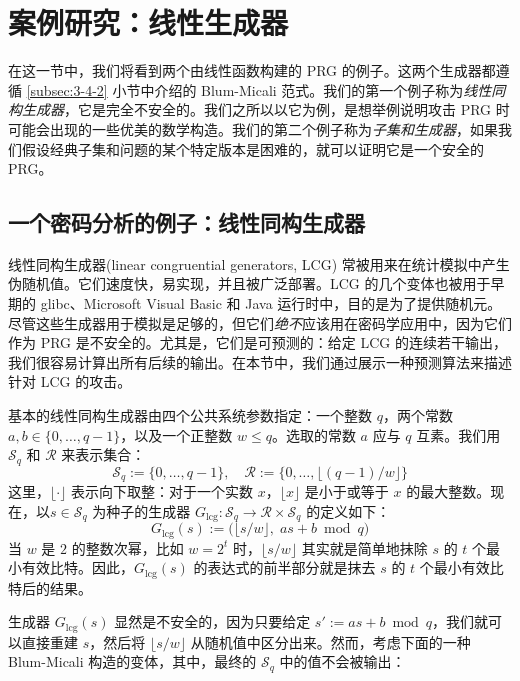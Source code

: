 \section{案例研究：线性生成器}

在这一节中，我们将看到两个由线性函数构建的 PRG 的例子。这两个生成器都遵循 \ref{subsec:3-4-2} 小节中介绍的 Blum-Micali 范式。我们的第一个例子称为\emph{线性同构生成器}，它是完全不安全的。我们之所以以它为例，是想举例说明攻击 PRG 时可能会出现的一些优美的数学构造。我们的第二个例子称为\emph{子集和生成器}，如果我们假设经典子集和问题的某个特定版本是困难的，就可以证明它是一个安全的 PRG。

\subsection{一个密码分析的例子：线性同构生成器}

线性同构生成器(linear congruential generators, LCG) 常被用来在统计模拟中产生伪随机值。它们速度快，易实现，并且被广泛部署。LCG 的几个变体也被用于早期的 glibc、Microsoft Visual Basic 和 Java 运行时中，目的是为了提供随机元。尽管这些生成器用于模拟是足够的，但它们\emph{绝不}应该用在密码学应用中，因为它们作为 PRG 是不安全的。尤其是，它们是可预测的：给定 LCG 的连续若干输出，我们很容易计算出所有后续的输出。在本节中，我们通过展示一种预测算法来描述针对 LCG 的攻击。

基本的线性同构生成器由四个公共系统参数指定：一个整数 $q$，两个常数 $a,b\in\{0,\dots,q-1\}$，以及一个正整数 $w\leq q$。选取的常数 $a$ 应与 $q$ 互素。我们用 $\mathcal{S}_q$ 和 $\mathcal{R}$ 来表示集合：
\[
\mathcal{S}_q:=\{0,\dots,q-1\},
\quad
\mathcal{R}:=\{0,\dots,\lfloor(q-1)/w\rfloor\}
\]
这里，$\lfloor\cdot\rfloor$ 表示向下取整：对于一个实数 $x$，$\lfloor x\rfloor$ 是小于或等于 $x$ 的最大整数。现在，以$s\in\mathcal{S}_q$ 为种子的生成器 $G_\mathrm{lcg}:\mathcal{S}_q\to\mathcal{R}\times\mathcal{S}_q$ 的定义如下：
\[
G_\mathrm{lcg}(s)
:=
\big(
\lfloor s/w \rfloor,\;
as+b\bmod q
\big)
\]
当 $w$ 是 $2$ 的整数次幂，比如 $w=2^t$ 时，$\lfloor s/w \rfloor$ 其实就是简单地抹除 $s$ 的 $t$ 个最小有效比特。因此，$G_\mathrm{lcg}(s)$ 的表达式的前半部分就是抹去 $s$ 的 $t$ 个最小有效比特后的结果。

生成器 $G_\mathrm{lcg}(s)$ 显然是不安全的，因为只要给定 $s':=as+b\bmod q$，我们就可以直接重建 $s$，然后将 $\lfloor s/w \rfloor$ 从随机值中区分出来。然而，考虑下面的一种 Blum-Micali 构造的变体，其中，最终的 $\mathcal{S}_q$ 中的值不会被输出：

\vspace*{10pt}

